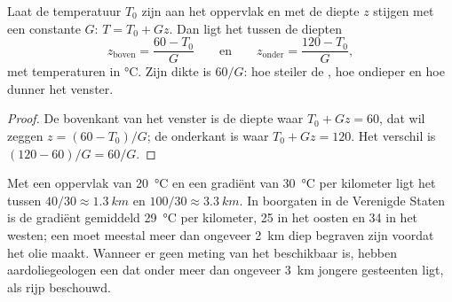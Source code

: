 \begin{proposition}\label{prop:g11:fossil-fuel-geology:window-depth}
Laat de temperatuur $T_0$ zijn aan het oppervlak en met de diepte $z$ stijgen met een
constante  $G$: $T = T_0 + G z$. Dan ligt het 
tussen de diepten
\[
  z_{\text{boven}} = \frac{60 - T_0}{G}
  \qquad\text{en}\qquad
  z_{\text{onder}} = \frac{120 - T_0}{G},
\]
met temperaturen in \unit{\degreeCelsius}. Zijn dikte is $60/G$: hoe
steiler de , hoe ondieper en hoe dunner het venster.
\end{proposition}

\begin{proof}
De bovenkant van het venster is de diepte waar $T_0 + G z = 60$, dat wil zeggen
$z = (60 - T_0)/G$; de onderkant is waar $T_0 + G z = 120$. Het verschil is
$(120 - 60)/G = 60/G$.
\end{proof}

Met een oppervlak van \qty{20}{\degreeCelsius} en een gradiënt van
\qty{30}{\degreeCelsius} per kilometer ligt het  tussen
$40/30 \approx \qty{1.3}{km}$ en $100/30 \approx \qty{3.3}{km}$. In boorgaten
in de Verenigde Staten is de gradiënt gemiddeld
\qty{29}{\degreeCelsius} per kilometer, \num{25} in het oosten en \num{34}
in het westen; een  moet meestal meer dan ongeveer
\qty{2}{km} diep begraven zijn voordat het olie maakt. Wanneer er geen meting van het 
beschikbaar is, hebben aardoliegeologen een  dat onder meer
dan ongeveer \qty{3}{km} jongere gesteenten ligt, als rijp beschouwd.

